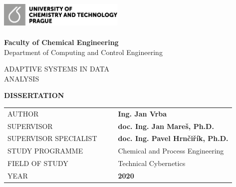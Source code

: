 \cleardoublepage
\thispagestyle{empty}
\thispagestyle{empty}
\noindent
\includegraphics[width=0.45\textwidth]{IMG/TOP/logoUCT_basic_CB.png} \\
\vspace{10mm}
\\
{\Large \textbf{Faculty of Chemical Engineering}
\\ [5mm]
Department of Computing and Control Engineering}

\vspace{30mm}

\begin{spacing}{0.9}
\Huge\noindent ADAPTIVE SYSTEMS IN DATA \\ANALYSIS\\
\end{spacing}

\vspace{20mm}

\noindent
{\Large \textbf{DISSERTATION}} 

\vspace{10mm}

\begin{table}[!h]
\begin{tabular}{  l l |l  l }
\hspace{-0.5em}AUTHOR & \hspace{0mm} & & {\Large \textbf{Ing. Jan Vrba}} \\ [5mm]
\hspace{-0.5em}SUPERVISOR &  &  & \textbf{\large doc. Ing. Jan Mareš, Ph.D.}\\ [5mm]
\hspace{-0.5em}SUPERVISOR SPECIALIST    &     &   & {\textbf{\large doc. Ing. Pavel Hrnčiřík, Ph.D.}} \\ [5mm]
\hspace{-0.5em}STUDY PROGRAMME &  &  & {\large Chemical and Process Engineering} \\ [5mm]
\hspace{-0.5em}FIELD OF STUDY & &   & {\large Technical Cybernetics}\\ [5mm]
\hspace{-0.5em}YEAR          &       &   & \textbf{2020}
\end{tabular}


\end{table}

